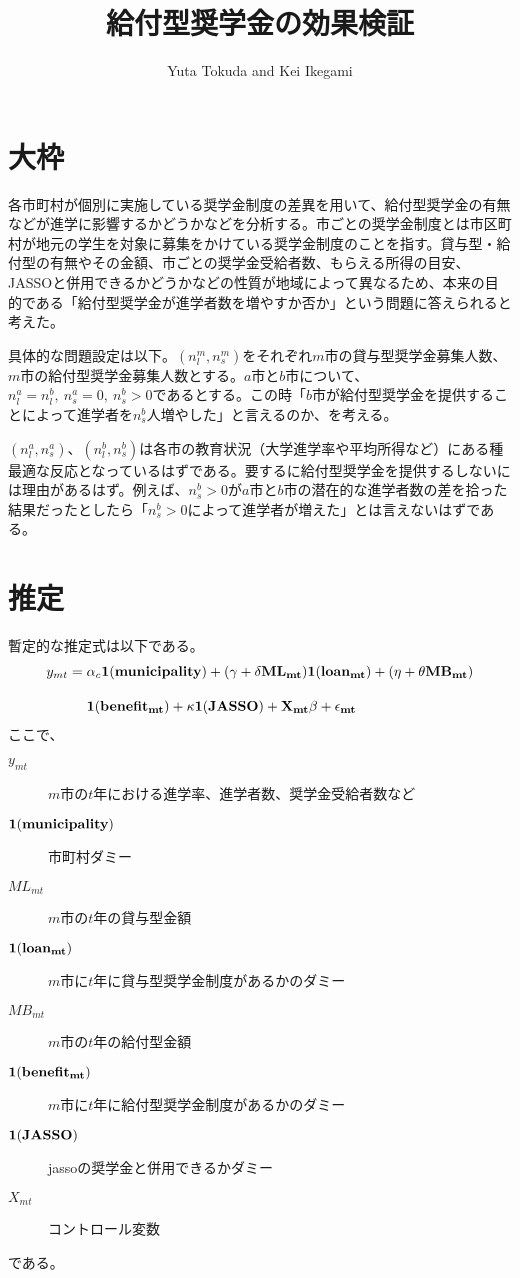 \documentclass{jsarticle}
\begin{document}
\title{給付型奨学金の効果検証}
\author{Yuta Tokuda and Kei Ikegami}
\maketitle

\section{大枠}
各市町村が個別に実施している奨学金制度の差異を用いて、給付型奨学金の有無などが進学に影響するかどうかなどを分析する。市ごとの奨学金制度とは市区町村が地元の学生を対象に募集をかけている奨学金制度のことを指す。貸与型・給付型の有無やその金額、市ごとの奨学金受給者数、もらえる所得の目安、JASSOと併用できるかどうかなどの性質が地域によって異なるため、本来の目的である「給付型奨学金が進学者数を増やすか否か」という問題に答えられると考えた。
\par
具体的な問題設定は以下。$(n_l^m, n_s^m)$をそれぞれ$m$市の貸与型奨学金募集人数、$m$市の給付型奨学金募集人数とする。$a$市と$b$市について、$n_l^a = n_l^b,\ n_s^a = 0,\ n_s^b > 0$であるとする。この時「$b$市が給付型奨学金を提供することによって進学者を$n_s^b$人増やした」と言えるのか、を考える。
\par
$(n_l^a, n_s^a)$、$(n_l^b, n_s^b)$は各市の教育状況（大学進学率や平均所得など）にある種最適な反応となっているはずである。要するに給付型奨学金を提供するしないには理由があるはず。例えば、$n_s^b > 0$が$a$市と$b$市の潜在的な進学者数の差を拾った結果だったとしたら「$n_s^b > 0$によって進学者が増えた」とは言えないはずである。

\section{推定}
暫定的な推定式は以下である。
\begin{align*}
y_{mt}&=\alpha_{c}\bf1 (municipality)+(\gamma+\delta ML_{mt})\bf1(loan_{mt})+(\eta+\theta MB_{mt})\\[10pt]& \quad\  \bf1(benefit_{mt})+\kappa\bf1(JASSO)+X_{mt}\beta+\epsilon_{mt}
\end{align*}
ここで、
	\begin{description}
	        \item[$y_{mt}$] $m$市の$t$年における進学率、進学者数、奨学金受給者数など
		\item[$\bf1 (municipality)$]  市町村ダミー
		\item[$ML_{mt}$]  $m$市の$t$年の貸与型金額
		\item[$\bf1(loan_{mt})$]  $m$市に$t$年に貸与型奨学金制度があるかのダミー
		\item[$MB_{mt}$]  $m$市の$t$年の給付型金額
		\item[$\bf1(benefit_{mt})$]  $m$市に$t$年に給付型奨学金制度があるかのダミー
		\item[$\bf1(JASSO)$]  jassoの奨学金と併用できるかダミー
	　　 \item[$X_{mt}$]  コントロール変数
	\end{description}
	である。
\end{document}
